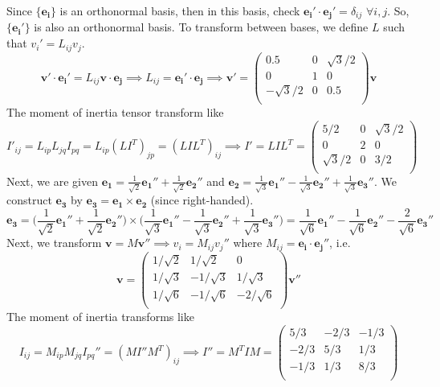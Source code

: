 \documentclass[a4paper]{article}
\begin{document}
\begin{ans}
Since $\{\mathbf{e_i}\}$ is an orthonormal basis, then in this basis, check $\mathbf{e_i'}\cdot\mathbf{e_j'}=\delta_{ij}$ $\forall i,j$. So, $\{\mathbf{e_i}'\}$ is also an orthonormal basis. To transform between bases, we define $L$ such that $v_i'=L_{ij}v_j$. 
$$\mathbf{v'}\cdot\mathbf{e_i'}=L_{ij}\mathbf{v}\cdot\mathbf{e_j}\implies L_{ij}=\mathbf{e_i'}\cdot\mathbf{e_j}\implies\mathbf{v'}=\begin{pmatrix}0.5&0&\sqrt{3}/2\\0&1&0\\-\sqrt{3}/2&0&0.5\\\end{pmatrix}\mathbf{v}$$
The moment of inertia tensor transform like
$$I'_{ij}=L_{ip}L_{jq}I_{pq}=L_{ip}(LI^T)_{jp}=(LIL^T)_{ij}\implies I'=LIL^T=\begin{pmatrix}5/2&0&\sqrt{3}/2\\0&2&0\\\sqrt{3}/2&0&3/2\\\end{pmatrix}$$
Next, we are given $\mathbf{e_1}=\frac{1}{\sqrt{2}}\mathbf{e_1''}+\frac{1}{\sqrt{2}}\mathbf{e_2''}$ and $\mathbf{e_2}=\frac{1}{\sqrt{3}}\mathbf{e_1''}-\frac{1}{\sqrt{3}}\mathbf{e_2''}+\frac{1}{\sqrt{3}}\mathbf{e_3''}$. We construct $\mathbf{e_3}$ by $\mathbf{e_3}=\mathbf{e_1}\times\mathbf{e_2}$ (since right-handed).
$$\mathbf{e_3}=\bigg(\frac{1}{\sqrt{2}}\mathbf{e_1''}+\frac{1}{\sqrt{2}}\mathbf{e_2''}\bigg)\times\bigg(\frac{1}{\sqrt{3}}\mathbf{e_1''}-\frac{1}{\sqrt{3}}\mathbf{e_2''}+\frac{1}{\sqrt{3}}\mathbf{e_3''}\bigg)=\frac{1}{\sqrt{6}}\mathbf{e_1''}-\frac{1}{\sqrt{6}}\mathbf{e_2''}-\frac{2}{\sqrt{6}}\mathbf{e_3''}$$ 
Next, we transform $\mathbf{v}=M\mathbf{v''}\implies v_i=M_{ij}v_j''$ where $M_{ij}=\mathbf{e_i}\cdot\mathbf{e_j''}$, i.e.
$$\mathbf{v}=\begin{pmatrix}1/\sqrt{2}&1/\sqrt{2}&0\\1/\sqrt{3}&-1/\sqrt{3}&1/\sqrt{3}\\1/\sqrt{6}&-1/\sqrt{6}&-2/\sqrt{6}\\\end{pmatrix}\mathbf{v''}$$
The moment of inertia transforms like
$$I_{ij}=M_{ip}M_{jq}I_{pq}''=(MI''M^T)_{ij}\implies I''=M^TIM=\begin{pmatrix}5/3&-2/3&-1/3\\-2/3&5/3&1/3\\-1/3&1/3&8/3\\\end{pmatrix}$$

\end{ans}
\end{document}
